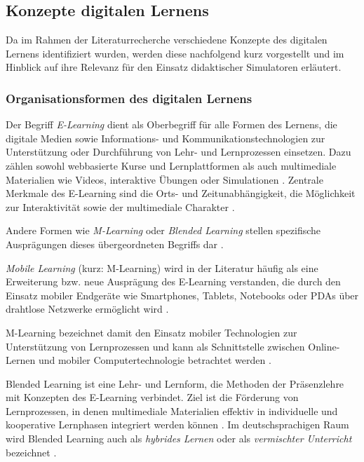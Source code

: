 \subsection{Konzepte digitalen Lernens}

Da im Rahmen der Literaturrecherche verschiedene Konzepte des digitalen Lernens identifiziert wurden, werden diese nachfolgend kurz vorgestellt und im Hinblick auf ihre Relevanz für den Einsatz didaktischer Simulatoren erläutert.

\subsubsection{Organisationsformen des digitalen Lernens}

Der Begriff \textit{E-Learning} dient als Oberbegriff für alle Formen des Lernens, die digitale Medien sowie Informations- und Kommunikationstechnologien zur Unterstützung oder Durchführung von Lehr- und Lernprozessen einsetzen. Dazu zählen sowohl webbasierte Kurse und Lernplattformen als auch multimediale Materialien wie Videos, interaktive Übungen oder Simulationen \parencite[S.~6]{kerres_mediendidaktik_2018}. Zentrale Merkmale des E-Learning sind die Orts- und Zeitunabhängigkeit, die Möglichkeit zur Interaktivität sowie der multimediale Charakter \parencite[S.~186f]{sanderson_e-learning_2002}. 

Andere Formen wie \textit{M-Learning} oder \textit{Blended Learning} stellen spezifische Ausprägungen dieses übergeordneten Begriffs dar \parencites[S.~74]{magenheim_blended_2003}[S.~3]{balaji_perspective_2016}.

\textit{Mobile Learning} (kurz: M-Learning) wird in der Literatur häufig als eine Erweiterung bzw. neue Ausprägung des E-Learning verstanden, die durch den Einsatz mobiler Endgeräte wie Smartphones, Tablets, Notebooks oder PDAs über drahtlose Netzwerke ermöglicht wird \parencites[S.~3f]{balaji_perspective_2016}[S.~197]{basak_kumar_e-learning_2018}. 

M-Learning bezeichnet damit den Einsatz mobiler Technologien zur Unterstützung von Lernprozessen und kann als Schnittstelle zwischen Online-Lernen und mobiler Computertechnologie betrachtet werden \parencite[S.~265]{traxler_defining_2005}. 

Blended Learning ist eine Lehr- und Lernform, die Methoden der Präsenzlehre mit Konzepten des E-Learning verbindet. Ziel ist die Förderung von Lernprozessen, in denen multimediale Materialien effektiv in individuelle und kooperative Lernphasen integriert werden können \parencite[S.~74]{magenheim_blended_2003}. Im deutschsprachigen Raum wird Blended Learning auch als \textit{hybrides Lernen} oder als \textit{vermischter Unterricht} bezeichnet \parencite[S.~29]{pfeffer_simulationsumgebungen_2008}.

